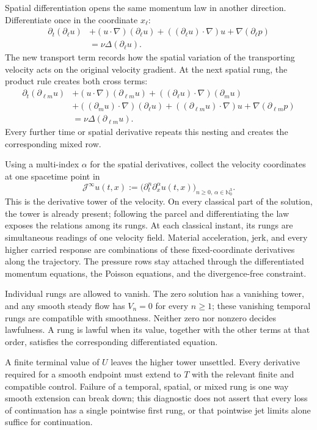 Spatial differentiation opens the same momentum law in another direction.
Differentiate once in the coordinate \(x_\ell\):
\[
  \begin{aligned}
  \partial_t(\partial_\ell u)
  &+
  (u\cdot\nabla)(\partial_\ell u)
  +
  ((\partial_\ell u)\cdot\nabla)u
  +
  \nabla(\partial_\ell p)\\
  &=
  \nu\Delta(\partial_\ell u).
  \end{aligned}
\]
The new transport term records how the spatial variation of the transporting velocity acts on the original velocity gradient.
At the next spatial rung, the product rule creates both cross terms:
\[
  \begin{aligned}
  \partial_t(\partial_{\ell m}u)
  &+
  (u\cdot\nabla)(\partial_{\ell m}u)
  +
  ((\partial_\ell u)\cdot\nabla)(\partial_m u)\\
  &+
  ((\partial_m u)\cdot\nabla)(\partial_\ell u)
  +
  ((\partial_{\ell m}u)\cdot\nabla)u
  +
  \nabla(\partial_{\ell m}p)\\
  &=
  \nu\Delta(\partial_{\ell m}u).
  \end{aligned}
\]
Every further time or spatial derivative repeats this nesting and creates the corresponding mixed row.

Using a multi-index \(\alpha\) for the spatial derivatives, collect the velocity coordinates at one spacetime point in
\[
  \mathcal J^\infty u(t,x)
  :=
  \bigl(
    \partial_t^n\partial_x^\alpha u(t,x)
  \bigr)_{n\geq0,\,\alpha\in\mathbb N_0^3}.
\]
This is the derivative tower of the velocity.
On every classical part of the solution, the tower is already present; following the parcel and differentiating the law exposes the relations among its rungs.
At each classical instant, its rungs are simultaneous readings of one velocity field.
Material acceleration, jerk, and every higher carried response are combinations of these fixed-coordinate derivatives along the trajectory.
The pressure rows stay attached through the differentiated momentum equations, the Poisson equations, and the divergence-free constraint.

Individual rungs are allowed to vanish.
The zero solution has a vanishing tower, and any smooth steady flow has \(V_n=0\) for every \(n\geq1\); these vanishing temporal rungs are compatible with smoothness.
Neither zero nor nonzero decides lawfulness.
A rung is lawful when its value, together with the other terms at that order, satisfies the corresponding differentiated equation.

A finite terminal value of \(U\) leaves the higher tower unsettled.
Every derivative required for a smooth endpoint must extend to \(T\) with the relevant finite and compatible control.
Failure of a temporal, spatial, or mixed rung is one way smooth extension can break down; this diagnostic does not assert that every loss of continuation has a single pointwise first rung, or that pointwise jet limits alone suffice for continuation.
